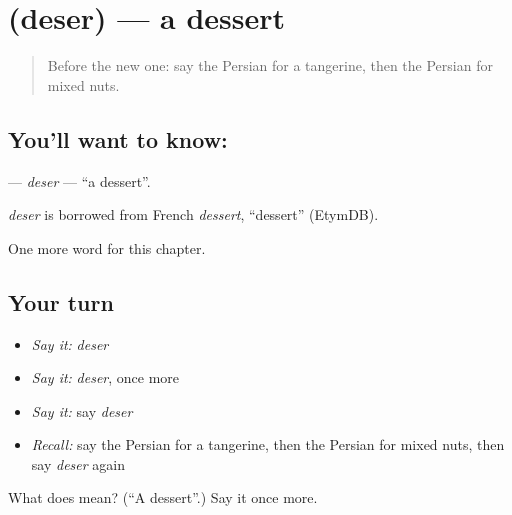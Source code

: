 \section[\texorpdfstring{\fa{دسر} (deser)}{دسر (deser)}]{ (deser) — a dessert}

\label{lesson:FA-C241-deser}



\begin{quote}
Before the new one: say the Persian for a tangerine, then the Persian for mixed nuts.
\end{quote}

\subsection*{You'll want to know: }
\textbf{} — \emph{deser} — \textquotedblleft{}a dessert\textquotedblright{}.

\begin{cousinweb}
\emph{deser} is borrowed from French \emph{dessert}, \textquotedblleft{}dessert\textquotedblright{} (EtymDB).
\end{cousinweb}

\begin{grammarlens}[title={What you've built}]
One more word for this chapter.
\end{grammarlens}

\subsection*{Your turn}
\begin{itemize}
\raggedright
  \item \emph{Say it:} \emph{deser}
  \item \emph{Say it:} \emph{deser}, once more
  \item \emph{Say it:} say \emph{deser}
  \item \emph{Recall:} say the Persian for a tangerine, then the Persian for mixed nuts, then say \emph{deser} again
\end{itemize}

\begin{tcolorbox}[breakable,colback=teal!4,colframe=teal!35!black,title={Before you move on}]
What does  mean? (\textquotedblleft{}A dessert\textquotedblright{}.) Say it once more.
\end{tcolorbox}
